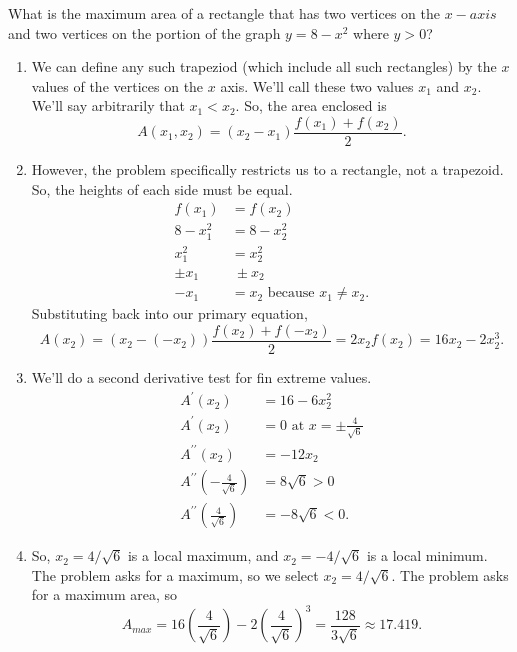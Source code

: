\begin{example}
	What is the maximum area of a rectangle that has two vertices on the $x-axis$ and two vertices on the portion of the graph $y=8-x^2$ where $y > 0$?
\end{example}
\begin{enumerate}
	\item We can define any such trapeziod (which include all such rectangles) by the $x$ values of the vertices on the $x$ axis.
		We'll call these two values $x_1$ and $x_2$.
		We'll say arbitrarily that $x_1 < x_2$.
		So, the area enclosed is
		\begin{equation*}
			A(x_1, x_2) = (x_2 - x_1)\frac{f(x_1) + f(x_2)}{2}.
		\end{equation*}
	\item However, the problem specifically restricts us to a rectangle, not a trapezoid.
		So, the heights of each side must be equal.
		\begin{align*}
			f(x_1) &= f(x_2) \\
			8 - x_1^2 &= 8 - x_2^2 \\
			x_1^2 &= x_2^2 \\
			\pm x_1 &\ \pm x_2 \\
			-x_1 &= x_2 \text{ because $x_1 \neq x_2$}.
		\end{align*}
		Substituting back into our primary equation,
		\begin{equation*}
			A(x_2) = (x_2 - (-x_2))\frac{f(x_2) + f(-x_2)}{2} = 2x_2f(x_2) = 16x_2 - 2x_2^3.
		\end{equation*}
	\item We'll do a second derivative test for fin extreme values.
		\begin{align*}
			A^\prime(x_2) &= 16 - 6x_2^2 \\
			A^\prime(x_2) &= 0 \text{ at } x = \pm\frac{4}{\sqrt{6}} \\
			A^{\prime\prime}(x_2) &= -12x_2 \\
			A^{\prime\prime}\left(-\frac{4}{\sqrt{6}}\right) &= 8\sqrt{6} > 0 \\
			A^{\prime\prime}\left(\frac{4}{\sqrt{6}}\right) &= -8\sqrt{6} < 0.
		\end{align*}
	\item So, $x_2 = 4/\sqrt{6}$ is a local maximum, and $x_2 = -4/\sqrt{6}$ is a local minimum.
		The problem asks for a maximum, so we select $x_2 = 4/\sqrt{6}$.
		The problem asks for a maximum area, so
		\begin{equation*}
			A_{max} = 16\left(\frac{4}{\sqrt{6}}\right) - 2\left(\frac{4}{\sqrt{6}}\right)^3 = \frac{128}{3\sqrt{6}} \approx 17.419.
		\end{equation*}
\end{enumerate}